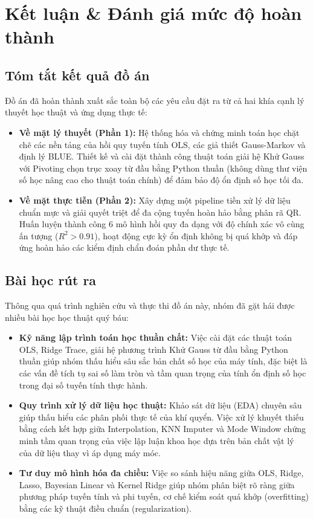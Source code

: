 \documentclass[12pt,a4paper]{article}
\begin{document}
\clearpage

\section{Kết luận \& Đánh giá mức độ hoàn thành}

\subsection{Tóm tắt kết quả đồ án}
Đồ án đã hoàn thành xuất sắc toàn bộ các yêu cầu đặt ra từ cả hai khía cạnh lý thuyết học thuật và ứng dụng thực tế:
\begin{itemize}
    \item \textbf{Về mặt lý thuyết (Phần 1):} Hệ thống hóa và chứng minh toán học chặt chẽ các nền tảng của hồi quy tuyến tính OLS, các giả thiết Gauss-Markov và định lý BLUE. Thiết kế và cài đặt thành công thuật toán giải hệ Khử Gauss với Pivoting chọn trục xoay từ đầu bằng Python thuần (không dùng thư viện số học nâng cao cho thuật toán chính) để đảm bảo độ ổn định số học tối đa.
    \item \textbf{Về mặt thực tiễn (Phần 2):} Xây dựng một pipeline tiền xử lý dữ liệu chuẩn mực và giải quyết triệt để đa cộng tuyến hoàn hảo bằng phân rã QR. Huấn luyện thành công 6 mô hình hồi quy đa dạng với độ chính xác vô cùng ấn tượng ($R^2 > 0.91$), hoạt động cực kỳ ổn định không bị quá khớp và đáp ứng hoàn hảo các kiểm định chẩn đoán phần dư thực tế.
\end{itemize}

\subsection{Bài học rút ra}
Thông qua quá trình nghiên cứu và thực thi đồ án này, nhóm đã gặt hái được nhiều bài học học thuật quý báu:
\begin{itemize}
    \item \textbf{Kỹ năng lập trình toán học thuần chất:} Việc cài đặt các thuật toán OLS, Ridge Trace, giải hệ phương trình Khử Gauss từ đầu bằng Python thuần giúp nhóm thấu hiểu sâu sắc bản chất số học của máy tính, đặc biệt là các vấn đề tích tụ sai số làm tròn và tầm quan trọng của tính ổn định số học trong đại số tuyến tính thực hành.
    \item \textbf{Quy trình xử lý dữ liệu học thuật:} Khảo sát dữ liệu (EDA) chuyên sâu giúp thấu hiểu các phân phối thực tế của khí quyển. Việc xử lý khuyết thiếu bằng cách kết hợp giữa Interpolation, KNN Imputer và Mode Window chứng minh tầm quan trọng của việc lập luận khoa học dựa trên bản chất vật lý của dữ liệu thay vì áp dụng máy móc.
    \item \textbf{Tư duy mô hình hóa đa chiều:} Việc so sánh hiệu năng giữa OLS, Ridge, Lasso, Bayesian Linear và Kernel Ridge giúp nhóm phân biệt rõ ràng giữa phương pháp tuyến tính và phi tuyến, cơ chế kiểm soát quá khớp (overfitting) bằng các kỹ thuật điều chuẩn (regularization).
\end{itemize}
\end{document}
